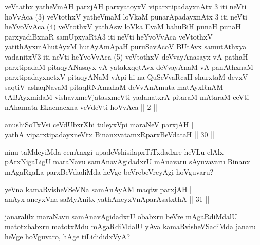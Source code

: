 \begin{kandikeshl}
veVtathx yatheVmAH parxjAH parxyatoyxV viparxtipadayxnAtx 3 iti neVti hoVvAca (3) veVtothxV yatheVmaM loVkaM punarApadayxnAtx 3 iti neVti heYvoVvAca (4) veVtothxV yathAsw loVka EvaM bahuBiH punaH punaH parxyadiBxnaR samUpxyaRtA3 iti neVti heYvoVvAca veVtothxV yatithAyxmAhutAyxM hutAyAmApaH puruSavAcoV BUtAvx samutAthxya vadanitxV3 iti neVti heYvoVvAca (5) veVtothxV deVvayAnasayx vA pathaH parxtipadaM pitaqyANasayx vA yatakxqqtAvx deVvayAnaM vA panAthxnaM parxtipadayxnetxV pitaqyANaM vApi hi na QuSeVvaRcaH shurxtaM devxV saqtiV ashaqNavaM pitaqRNAmahaM deVvAnAmuta matAyxRnAM tABAyxmidaM vishavxmeVjatasxmeVti yadanatxrA pitaraM mAtaraM ceVti nAhamata Ekacnacxna veVdeVti hoVvAca || 2 ||
\end{kandikeshl}


\begin{shl}
anushiSoTxV\s si ceVdUbxrXhi tuleyxV\s pi maraNeV parxjAH | \\
yathA viparxtipadayxneVtx BinanxvatamxRparxBeVdataH \hfill|| 30 || 
\end{shl}

\begin{artha}
ninu taMdeyiMda cenAnxgi upadeVshisilapxTiTxdadxre heVLu
elAlx pArxNigaLigU maraNavu samAnavAgidadxrU mAnavaru sAyuvavaru 
Binanx mAgaRgaLa parxBeVdadiMda heVge beVrebeVreyAgi hoVguvaru?
\end{artha}


\begin{shl}
yeVna kamaRvisheVSeVNa samAnAyAM maqtw parxjAH | \\
anAyx aneyxVna saMyAnitx yathA\s neyxVnAparAsatxthA \hfill|| 31 || 
\end{shl}

\begin{artha}
janaralilx maraNavu samAnavAgidadxrU obabxru beVre mAgaRdiMdalU 
matotxbabxru matotxMdu mAgaRdiMdalU yAva kamaRvisheVSadiMda janaru 
heVge hoVguvaro, hAge tiLidididxVyA?
\end{artha}


